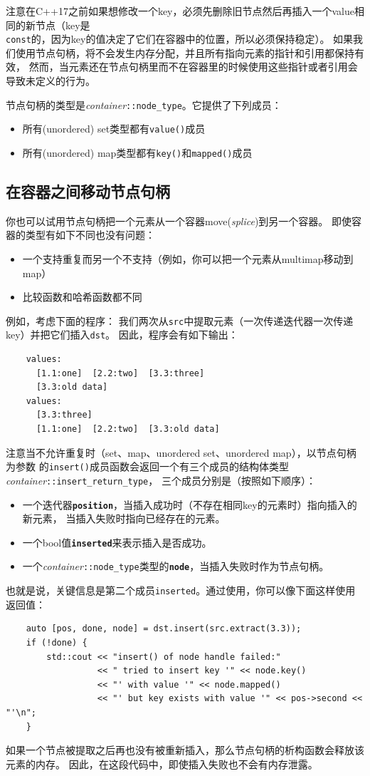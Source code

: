 注意在C++17之前如果想修改一个key，必须先删除旧节点然后再插入一个value相同的新节点（key是\\
\texttt{const}的，因为key的值决定了它们在容器中的位置，所以必须保持稳定）。
如果我们使用节点句柄，将不会发生内存分配，并且所有指向元素的指针和引用都保持有效，
然而，当元素还在节点句柄里而不在容器里的时候使用这些指针或者引用会导致未定义的行为。

节点句柄的类型是\emph{container}\texttt{::node\_type}。它提供了下列成员：
\begin{itemize}
    \item 所有(unordered) set类型都有\texttt{value()}成员
    \item 所有(unordered) map类型都有\texttt{key()}和\texttt{mapped()}成员
\end{itemize}

\subsection{在容器之间移动节点句柄}
你也可以试用节点句柄把一个元素从一个容器move(\emph{splice})到另一个容器。
即使容器的类型有如下不同也没有问题：
\begin{itemize}
    \item 一个支持重复而另一个不支持（例如，你可以把一个元素从multimap移动到map）
    \item 比较函数和哈希函数都不同
\end{itemize}
例如，考虑下面的程序：
我们两次从\texttt{src}中提取元素（一次传递迭代器一次传递key）并把它们插入\texttt{dst}。
因此，程序会有如下输出：
\begin{lstlisting}
    values:
      [1.1:one]  [2.2:two]  [3.3:three]
      [3.3:old data]
    values:
      [3.3:three]
      [1.1:one]  [2.2:two]  [3.3:old data]
\end{lstlisting}
注意当不允许重复时（set、map、unordered set、unordered map），以节点句柄为参数
的\texttt{insert()}成员函数会返回一个有三个成员的结构体类型\emph{container}\texttt{::insert\_return\_type}，
三个成员分别是（按照如下顺序）：
\begin{itemize}
    \item 一个迭代器\textbf{\texttt{position}}，当插入成功时（不存在相同key的元素时）指向插入的新元素，
    当插入失败时指向已经存在的元素。
    \item 一个bool值\textbf{\texttt{inserted}}来表示插入是否成功。
    \item 一个\emph{container}\texttt{::node\_type}类型的\textbf{\texttt{node}}，当插入失败时作为节点句柄。
\end{itemize}
也就是说，关键信息是第二个成员\texttt{inserted}。通过使用，你可以像下面这样使用返回值：
\begin{lstlisting}
    auto [pos, done, node] = dst.insert(src.extract(3.3));
    if (!done) {
        std::cout << "insert() of node handle failed:"
                  << " tried to insert key '" << node.key()
                  << "' with value '" << node.mapped()
                  << "' but key exists with value '" << pos->second << "'\n";
    }
\end{lstlisting}
如果一个节点被提取之后再也没有被重新插入，那么节点句柄的析构函数会释放该元素的内存。
因此，在这段代码中，即使插入失败也不会有内存泄露。

